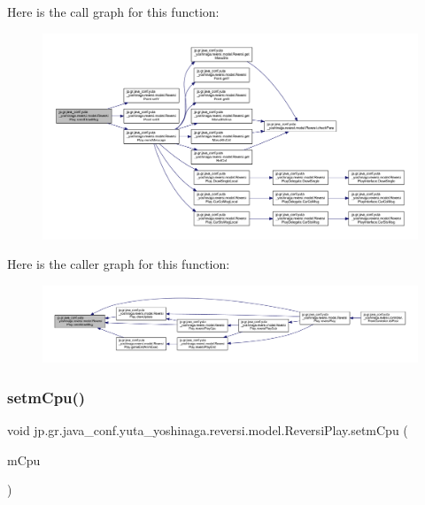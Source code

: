 Here is the call graph for this function\+:
\nopagebreak
\begin{figure}[H]
\begin{center}
\leavevmode
\includegraphics[width=350pt]{classjp_1_1gr_1_1java__conf_1_1yuta__yoshinaga_1_1reversi_1_1model_1_1_reversi_play_a93ebdb5fb7097984730a85f62ebb57d7_cgraph}
\end{center}
\end{figure}
Here is the caller graph for this function\+:
\nopagebreak
\begin{figure}[H]
\begin{center}
\leavevmode
\includegraphics[width=350pt]{classjp_1_1gr_1_1java__conf_1_1yuta__yoshinaga_1_1reversi_1_1model_1_1_reversi_play_a93ebdb5fb7097984730a85f62ebb57d7_icgraph}
\end{center}
\end{figure}
\mbox{\label{classjp_1_1gr_1_1java__conf_1_1yuta__yoshinaga_1_1reversi_1_1model_1_1_reversi_play_a2a3db559dc64c79e41e7b24fbf852faf}} 
\subsubsection{\texorpdfstring{setm\+Cpu()}{setmCpu()}}
{\footnotesize\ttfamily void jp.\+gr.\+java\+\_\+conf.\+yuta\+\_\+yoshinaga.\+reversi.\+model.\+Reversi\+Play.\+setm\+Cpu (\begin{DoxyParamCaption}\item[{\hyperlink{classjp_1_1gr_1_1java__conf_1_1yuta__yoshinaga_1_1reversi_1_1model_1_1_reversi_point}{Reversi\+Point} \mbox{[}$\,$\mbox{]}}]{m\+Cpu }\end{DoxyParamCaption})}



